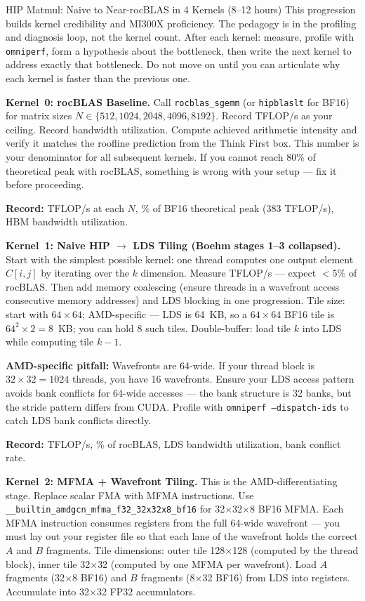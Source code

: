 \begin{exercise}{HIP Matmul: Naive to Near-rocBLAS in 4 Kernels (8--12 hours)}
This progression builds kernel credibility and MI300X proficiency. The pedagogy is in the profiling and diagnosis loop, not the kernel count. After each kernel: measure, profile with \texttt{omniperf}, form a hypothesis about the bottleneck, then write the next kernel to address exactly that bottleneck. Do not move on until you can articulate why each kernel is faster than the previous one.

\textbf{Kernel~0: rocBLAS Baseline.}
Call \texttt{rocblas\_sgemm} (or \texttt{hipblaslt} for BF16) for matrix sizes $N \in \{512, 1024, 2048, 4096, 8192\}$. Record TFLOP/s as your ceiling. Record bandwidth utilization. Compute achieved arithmetic intensity and verify it matches the roofline prediction from the Think First box. This number is your denominator for all subsequent kernels. If you cannot reach 80\% of theoretical peak with rocBLAS, something is wrong with your setup --- fix it before proceeding.

\textbf{Record:} TFLOP/s at each $N$, \% of BF16 theoretical peak (383 TFLOP/s), HBM bandwidth utilization.

\medskip
\textbf{Kernel~1: Naive HIP $\to$ LDS Tiling (Boehm stages 1--3 collapsed).}
Start with the simplest possible kernel: one thread computes one output element $C[i,j]$ by iterating over the $k$ dimension. Measure TFLOP/s --- expect $<5\%$ of rocBLAS. Then add memory coalescing (ensure threads in a wavefront access consecutive memory addresses) and LDS blocking in one progression. Tile size: start with $64 \times 64$; AMD-specific --- LDS is 64~KB, so a $64 \times 64$ BF16 tile is $64^2 \times 2 = 8$~KB; you can hold 8 such tiles. Double-buffer: load tile $k$ into LDS while computing tile $k-1$.

\textbf{AMD-specific pitfall:} Wavefronts are 64-wide. If your thread block is $32 \times 32 = 1024$ threads, you have 16 wavefronts. Ensure your LDS access pattern avoids bank conflicts for 64-wide accesses --- the bank structure is 32 banks, but the stride pattern differs from CUDA. Profile with \texttt{omniperf --dispatch-ids} to catch LDS bank conflicts directly.

\textbf{Record:} TFLOP/s, \% of rocBLAS, LDS bandwidth utilization, bank conflict rate.

\medskip
\textbf{Kernel~2: MFMA + Wavefront Tiling.}
This is the AMD-differentiating stage. Replace scalar FMA with MFMA instructions. Use \texttt{\_\_builtin\_amdgcn\_mfma\_f32\_32x32x8\_bf16} for 32$\times$32$\times$8 BF16 MFMA. Each MFMA instruction consumes registers from the full 64-wide wavefront --- you must lay out your register file so that each lane of the wavefront holds the correct $A$ and $B$ fragments. Tile dimensions: outer tile 128$\times$128 (computed by the thread block), inner tile 32$\times$32 (computed by one MFMA per wavefront). Load $A$ fragments (32$\times$8 BF16) and $B$ fragments (8$\times$32 BF16) from LDS into registers. Accumulate into 32$\times$32 FP32 accumulators.


\end{exercise}
